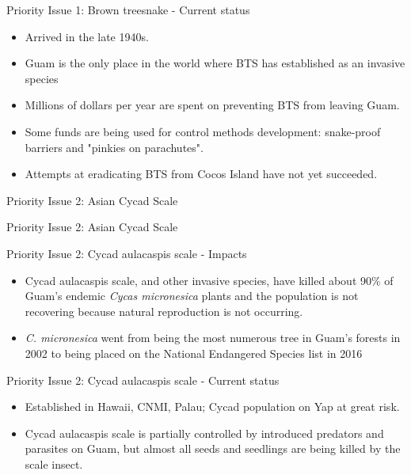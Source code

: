 \documentclass[]{beamer}
\begin{document}
\begin{frame}{Priority Issue 1: Brown treesnake - Current status}
\begin{itemize}
	\item Arrived in the late 1940s.
	\item Guam is the only place in the world where BTS has established as an invasive species
	\item Millions of dollars per year are spent on preventing BTS from leaving Guam.
	\item Some funds are being used for control methods development: snake-proof barriers and "pinkies on parachutes".
	\item Attempts at eradicating BTS from Cocos Island have not yet succeeded.
\end{itemize}	
\end{frame}

\begin{frame}{Priority Issue 2: Asian Cycad Scale}
\end{frame}

\begin{frame}{Priority Issue 2: Asian Cycad Scale}
\end{frame}

\begin{frame}{Priority Issue 2: Cycad aulacaspis scale - Impacts}
	\begin{itemize}
		\item Cycad aulacaspis scale, and other invasive species, have killed about 90\% of Guam's endemic \textit{Cycas micronesica} plants and the population is not recovering because natural reproduction is not occurring.
		\item{\textit{C. micronesica} went from being the most numerous tree in Guam's forests in 2002 to being placed on the National Endangered Species list in 2016}
	\end{itemize}
\end{frame}

\begin{frame}{Priority Issue 2: Cycad aulacaspis scale - Current status}
\begin{itemize}
	\item Established in Hawaii, CNMI, Palau; Cycad population on Yap at great risk.
	\item Cycad aulacaspis scale is partially controlled by introduced predators and parasites on Guam, but almost all seeds and seedlings are being killed by the scale insect.
\end{itemize}	
\end{frame}
\end{document}
